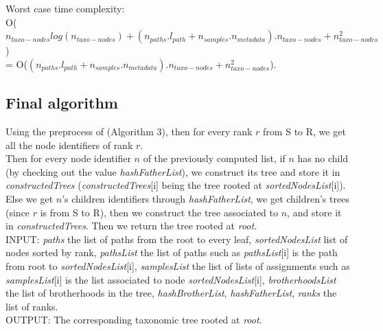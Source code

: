 \documentclass{report}
\begin{document}
Worst case time complexity:\\
O($n_{taxo-nodes}log(n_{taxo-nodes}) + (n_{paths}.l_{path} + n_{samples}.n_{metadata}).n_{taxo-nodes} + n_{taxo-nodes}^{2}$)\\
= O($(n_{paths}.l_{path} + n_{samples}.n_{metadata}).n_{taxo-nodes} + n_{taxo-nodes}^{2}$).\\

\subsection{Final algorithm}

Using the preprocess of (Algorithm 3), then for every rank $r$ from S to R, we get all the node identifiers of rank $r$.\\

Then for every node identifier $n$ of the previously computed list, if $n$ has no child (by checking out the value \emph{hashFatherList}), we construct its tree and store it in \emph{constructedTrees} (\emph{constructedTrees}[i] being the tree rooted at \emph{sortedNodesList}[i]).\\

Else we get $n$'s children identifiers through \emph{hashFatherList}, we get children's trees (since $r$ is from S to R), then we construct the tree associated to $n$, and store it in \emph{constructedTrees}. Then we return the tree rooted at \emph{root}.\\

\textsc{INPUT:} \emph{paths} the list of paths from the root to every leaf, \emph{sortedNodesList} list of nodes sorted by rank, \emph{pathsList} the list of paths such as \emph{pathsList}[i] is the path from root to \emph{sortedNodesList}[i], \emph{samplesList} the list of lists of assignments such as \emph{samplesList}[i] is the list associated to node \emph{sortedNodesList}[i], \emph{brotherhoodsList} the list of brotherhoods in the tree, \emph{hashBrotherList}, \emph{hashFatherList}, \emph{ranks} the list of ranks.\\

\textsc{OUTPUT:} The corresponding taxonomic tree rooted at \emph{root}.\\
\end{document}
